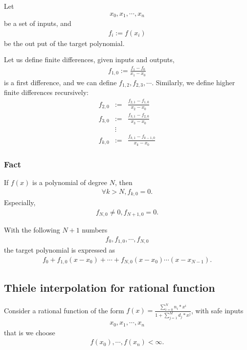 \documentclass[11pt]{book}
\begin{document}
Let 
\begin{eqnarray}
x_0, x_1, \cdots, x_n
\end{eqnarray}
be a set of inputs, and
\begin{eqnarray}
f_i := f(x_i)
\end{eqnarray}
be the out put of the target polynomial.

Let us define finite differences, given inputs and outputs,
\begin{eqnarray}
f_{1,0} := \frac{f_1 - f_0}{x_1 - x_0}
\end{eqnarray}
is a first difference, and we can define $f_{1,2}, f_{2,3}, \cdots$.
Similarly, we define higher finite differences recursively:
\begin{eqnarray}
f_{2,0} &:=& \frac{f_{2,1} - f_{1,0}}{x_2 - x_0} \\
f_{3,0} &:=& \frac{f_{3,1} - f_{2,0}}{x_3 - x_0} \\
\nonumber &\vdots& \\
f_{k,0} &:=& \frac{f_{k,1} - f_{k-1,0}}{x_k - x_0} 
\end{eqnarray}

\subsubsection{Fact}
If $f(x)$ is a polynomial of degree $N$, then
\begin{eqnarray}
\forall k > N, f_{k,0} = 0.
\end{eqnarray}
Especially,
\begin{eqnarray}
f_{N,0} \neq 0, f_{N+1, 0} = 0.
\end{eqnarray}

With the following $N+1$ numbers
\begin{eqnarray}
f_0, f_{1,0}, \cdots, f_{N,0}
\end{eqnarray}
the target polynomial is expressed as
\begin{eqnarray}
f_0 + f_{1,0}(x-x_0) + \cdots + f_{N,0} (x-x_0)\cdots (x-x_{N-1}).
\end{eqnarray}

\subsection{Thiele interpolation for rational function}
Consider a rational function of the form $f(x) = \frac{\sum_{i=0}^{N} n_i * x^i}{1+ \sum_{j=1}^{M } d_j * x^j}$, with safe inputs
\begin{eqnarray}
x_0, x_1, \cdots, x_n
\end{eqnarray}
that is we choose
\begin{eqnarray}
f(x_0), \cdots, f(x_n) < \infty.
\end{eqnarray}
\end{document}
